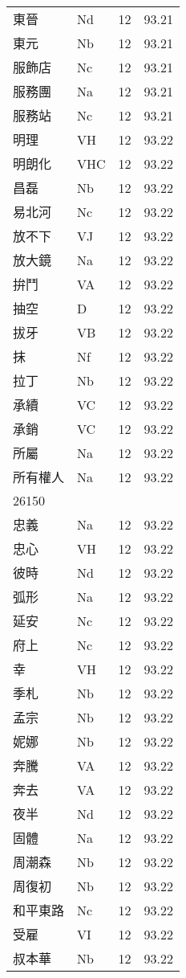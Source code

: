 \documentclass[twocolumn]{book}
\begin{document}
\begin{supertabular}{llrr}
東晉 & Nd & 12 &  93.21\\
東元 & Nb & 12 &  93.21\\
服飾店 & Nc & 12 &  93.21\\
服務團 & Na & 12 &  93.21\\
服務站 & Nc & 12 &  93.21\\
明理 & VH & 12 &  93.22\\
明朗化 & VHC & 12 &  93.22\\
昌磊 & Nb & 12 &  93.22\\
易北河 & Nc & 12 &  93.22\\
放不下 & VJ & 12 &  93.22\\
放大鏡 & Na & 12 &  93.22\\
拚鬥 & VA & 12 &  93.22\\
抽空 & D & 12 &  93.22\\
拔牙 & VB & 12 &  93.22\\
抹 & Nf & 12 &  93.22\\
拉丁 & Nb & 12 &  93.22\\
承續 & VC & 12 &  93.22\\
承銷 & VC & 12 &  93.22\\
所屬 & Na & 12 &  93.22\\
所有權人 & Na & 12 &  93.22\\
26150\\
忠義 & Na & 12 &  93.22\\
忠心 & VH & 12 &  93.22\\
彼時 & Nd & 12 &  93.22\\
弧形 & Na & 12 &  93.22\\
延安 & Nc & 12 &  93.22\\
府上 & Nc & 12 &  93.22\\
幸 & VH & 12 &  93.22\\
季札 & Nb & 12 &  93.22\\
孟宗 & Nb & 12 &  93.22\\
妮娜 & Nb & 12 &  93.22\\
奔騰 & VA & 12 &  93.22\\
奔去 & VA & 12 &  93.22\\
夜半 & Nd & 12 &  93.22\\
固體 & Na & 12 &  93.22\\
周潮森 & Nb & 12 &  93.22\\
周復初 & Nb & 12 &  93.22\\
和平東路 & Nc & 12 &  93.22\\
受雇 & VI & 12 &  93.22\\
叔本華 & Nb & 12 &  93.22\\

\end{supertabular}
\end{document}
